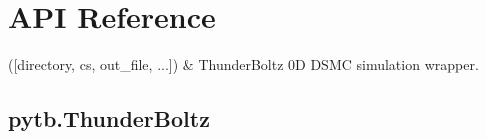 \documentclass[letterpaper,10pt,english,openany,oneside]{sphinxmanual}
\begin{document}
\sphinxstepscope


\section{API Reference}
\label{\detokenize{ref:api-reference}}\label{\detokenize{ref::doc}}

\begin{savenotes}\sphinxattablestart
\sphinxthistablewithglobalstyle
\sphinxthistablewithnovlinesstyle
\centering
\begin{tabulary}{\linewidth}[t]{}
\sphinxtoprule
\sphinxtableatstartofbodyhook
\sphinxAtStartPar
{\hyperref[\detokenize{api/pytb.ThunderBoltz:pytb.ThunderBoltz}]{}}({[}directory, cs, out\_file, ...{]})
&
\sphinxAtStartPar
ThunderBoltz 0D DSMC simulation wrapper.
\\
\sphinxbottomrule
\end{tabulary}
\sphinxtableafterendhook\par
\sphinxattableend\end{savenotes}

\sphinxstepscope


\subsection{pytb.ThunderBoltz}
\label{\detokenize{api/pytb.ThunderBoltz:pytb-thunderboltz}}\label{\detokenize{api/pytb.ThunderBoltz::doc}}
\end{document}
